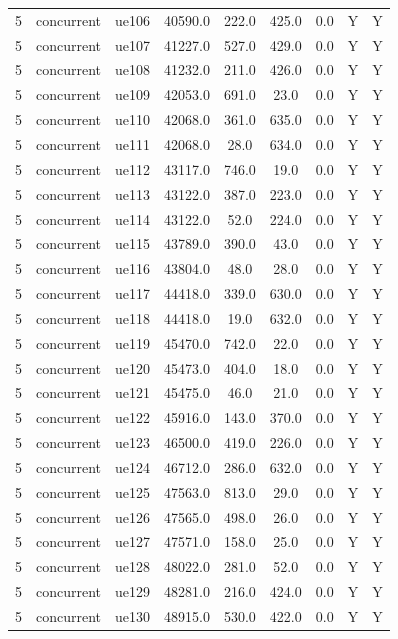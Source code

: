 \begin{table}[ht]
\begin{tabular}{|c|c|c|c|c|c|c|c|c|}
5 & concurrent & ue106 & 40590.0 & 222.0 & 425.0 & 0.0 & Y & Y \\
5 & concurrent & ue107 & 41227.0 & 527.0 & 429.0 & 0.0 & Y & Y \\
5 & concurrent & ue108 & 41232.0 & 211.0 & 426.0 & 0.0 & Y & Y \\
5 & concurrent & ue109 & 42053.0 & 691.0 & 23.0 & 0.0 & Y & Y \\
5 & concurrent & ue110 & 42068.0 & 361.0 & 635.0 & 0.0 & Y & Y \\
5 & concurrent & ue111 & 42068.0 & 28.0 & 634.0 & 0.0 & Y & Y \\
5 & concurrent & ue112 & 43117.0 & 746.0 & 19.0 & 0.0 & Y & Y \\
5 & concurrent & ue113 & 43122.0 & 387.0 & 223.0 & 0.0 & Y & Y \\
5 & concurrent & ue114 & 43122.0 & 52.0 & 224.0 & 0.0 & Y & Y \\
5 & concurrent & ue115 & 43789.0 & 390.0 & 43.0 & 0.0 & Y & Y \\
5 & concurrent & ue116 & 43804.0 & 48.0 & 28.0 & 0.0 & Y & Y \\
5 & concurrent & ue117 & 44418.0 & 339.0 & 630.0 & 0.0 & Y & Y \\
5 & concurrent & ue118 & 44418.0 & 19.0 & 632.0 & 0.0 & Y & Y \\
5 & concurrent & ue119 & 45470.0 & 742.0 & 22.0 & 0.0 & Y & Y \\
5 & concurrent & ue120 & 45473.0 & 404.0 & 18.0 & 0.0 & Y & Y \\
5 & concurrent & ue121 & 45475.0 & 46.0 & 21.0 & 0.0 & Y & Y \\
5 & concurrent & ue122 & 45916.0 & 143.0 & 370.0 & 0.0 & Y & Y \\
5 & concurrent & ue123 & 46500.0 & 419.0 & 226.0 & 0.0 & Y & Y \\
5 & concurrent & ue124 & 46712.0 & 286.0 & 632.0 & 0.0 & Y & Y \\
5 & concurrent & ue125 & 47563.0 & 813.0 & 29.0 & 0.0 & Y & Y \\
5 & concurrent & ue126 & 47565.0 & 498.0 & 26.0 & 0.0 & Y & Y \\
5 & concurrent & ue127 & 47571.0 & 158.0 & 25.0 & 0.0 & Y & Y \\
5 & concurrent & ue128 & 48022.0 & 281.0 & 52.0 & 0.0 & Y & Y \\
5 & concurrent & ue129 & 48281.0 & 216.0 & 424.0 & 0.0 & Y & Y \\
5 & concurrent & ue130 & 48915.0 & 530.0 & 422.0 & 0.0 & Y & Y \\

\end{tabular}
\end{table}

